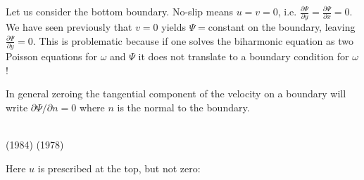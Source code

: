 Let us consider the bottom boundary. No-slip means $u=v=0$, i.e.
$\frac{\partial \Psi}{\partial y}=\frac{\partial \Psi}{\partial x}=0$. 
We have seen previously that $v=0$ yields $\Psi=$constant on the boundary,
leaving $\frac{\partial \Psi}{\partial y}=0$. This is problematic because if 
one solves the biharmonic equation as two Poisson equations for $\omega$ and $\Psi$
it does not translate to a boundary condition for $\omega$!

In general zeroing the tangential component of the velocity on a boundary will 
write $\partial \Psi/ \partial n =0$ where $n$ is the normal to the boundary.

\begin{center}
\\
\textcite{chri84} (1984) \hspace{4cm}
\textcite{woid78} (1978)
\end{center}


Here $u$ is prescribed at the top, but not zero:
\begin{center}
\\
\textcite{guda86c}
\end{center}

